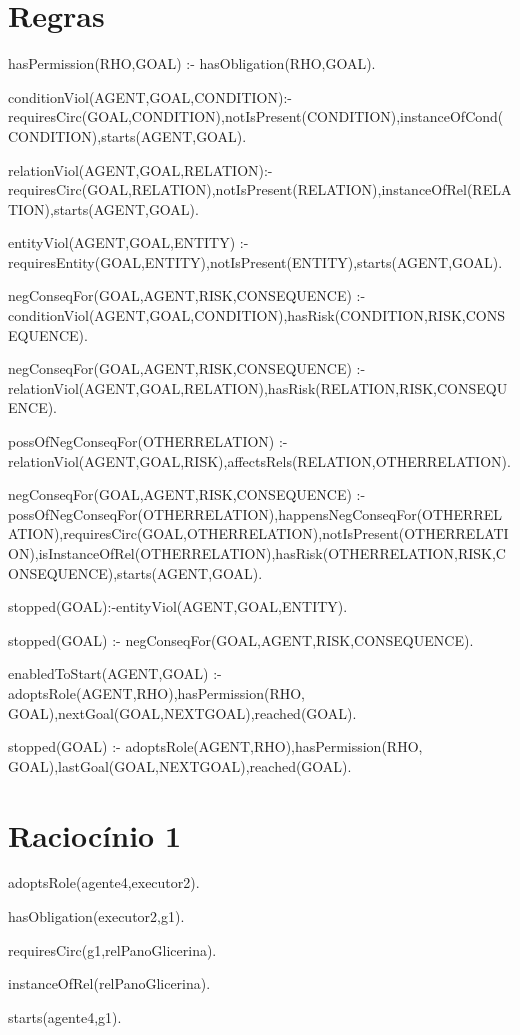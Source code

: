 \section{Regras}

hasPermission(RHO,GOAL) :- hasObligation(RHO,GOAL).

conditionViol(AGENT,GOAL,CONDITION):- requiresCirc(GOAL,CONDITION),notIsPresent(CONDITION),instanceOfCond(CONDITION),starts(AGENT,GOAL).

relationViol(AGENT,GOAL,RELATION):- requiresCirc(GOAL,RELATION),notIsPresent(RELATION),instanceOfRel(RELATION),starts(AGENT,GOAL).

entityViol(AGENT,GOAL,ENTITY) :- requiresEntity(GOAL,ENTITY),notIsPresent(ENTITY),starts(AGENT,GOAL).

negConseqFor(GOAL,AGENT,RISK,CONSEQUENCE) :- conditionViol(AGENT,GOAL,CONDITION),hasRisk(CONDITION,RISK,CONSEQUENCE).

negConseqFor(GOAL,AGENT,RISK,CONSEQUENCE) :- relationViol(AGENT,GOAL,RELATION),hasRisk(RELATION,RISK,CONSEQUENCE).

possOfNegConseqFor(OTHERRELATION) :- relationViol(AGENT,GOAL,RISK),affectsRels(RELATION,OTHERRELATION).

negConseqFor(GOAL,AGENT,RISK,CONSEQUENCE) :- possOfNegConseqFor(OTHERRELATION),happensNegConseqFor(OTHERRELATION),requiresCirc(GOAL,OTHERRELATION),notIsPresent(OTHERRELATION),isInstanceOfRel(OTHERRELATION),hasRisk(OTHERRELATION,RISK,CONSEQUENCE),starts(AGENT,GOAL).

stopped(GOAL):-entityViol(AGENT,GOAL,ENTITY).

stopped(GOAL) :- negConseqFor(GOAL,AGENT,RISK,CONSEQUENCE).

enabledToStart(AGENT,GOAL) :- adoptsRole(AGENT,RHO),hasPermission(RHO, GOAL),nextGoal(GOAL,NEXTGOAL),reached(GOAL).

stopped(GOAL) :- adoptsRole(AGENT,RHO),hasPermission(RHO, GOAL),lastGoal(GOAL,NEXTGOAL),reached(GOAL).


\section{Raciocínio 1}

adoptsRole(agente4,executor2).

hasObligation(executor2,g1).

requiresCirc(g1,relPanoGlicerina).

instanceOfRel(relPanoGlicerina). 

starts(agente4,g1).

